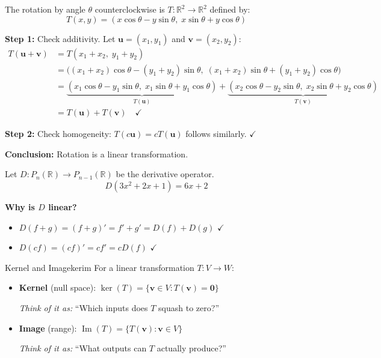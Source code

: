 \documentclass[12pt,a4paper]{book}
\begin{document}
\begin{examplebox}
The rotation by angle $\theta$ counterclockwise is $T: \mathbb{R}^2 \to \mathbb{R}^2$ defined by:
\[
T(x, y) = (x\cos\theta - y\sin\theta,\; x\sin\theta + y\cos\theta)
\]

\textbf{Step 1:} Check additivity. Let $\mathbf{u} = (x_1, y_1)$ and $\mathbf{v} = (x_2, y_2)$:
\begin{align*}
T(\mathbf{u} + \mathbf{v}) &= T(x_1 + x_2,\; y_1 + y_2) \\
&= \bigl((x_1+x_2)\cos\theta - (y_1+y_2)\sin\theta,\; (x_1+x_2)\sin\theta + (y_1+y_2)\cos\theta\bigr) \\
&= \underbrace{(x_1\cos\theta - y_1\sin\theta,\; x_1\sin\theta + y_1\cos\theta)}_{T(\mathbf{u})} + \underbrace{(x_2\cos\theta - y_2\sin\theta,\; x_2\sin\theta + y_2\cos\theta)}_{T(\mathbf{v})} \\
&= T(\mathbf{u}) + T(\mathbf{v}) \quad \checkmark
\end{align*}

\textbf{Step 2:} Check homogeneity: $T(c\mathbf{u}) = cT(\mathbf{u})$ follows similarly. $\checkmark$

\textbf{Conclusion:} Rotation is a linear transformation.
\end{examplebox}

\begin{examplebox}
Let $D: P_n(\mathbb{R}) \to P_{n-1}(\mathbb{R})$ be the derivative operator.
\[
D(3x^2 + 2x + 1) = 6x + 2
\]

\textbf{Why is $D$ linear?}
\begin{itemize}
    \item $D(f + g) = (f+g)' = f' + g' = D(f) + D(g)$ \quad $\checkmark$
    \item $D(cf) = (cf)' = cf' = cD(f)$ \quad $\checkmark$
\end{itemize}
\end{examplebox}

\begin{definition}{Kernel and Image}{kerim}
For a linear transformation $T: V \to W$:
\begin{itemize}
    \item \textbf{Kernel} (null space): $\ker(T) = \{\mathbf{v} \in V : T(\mathbf{v}) = \mathbf{0}\}$
    
    \textit{Think of it as:} ``Which inputs does $T$ squash to zero?''
    
    \item \textbf{Image} (range): $\operatorname{Im}(T) = \{T(\mathbf{v}) : \mathbf{v} \in V\}$
    
    \textit{Think of it as:} ``What outputs can $T$ actually produce?''
\end{itemize}
\end{definition}
\end{document}

